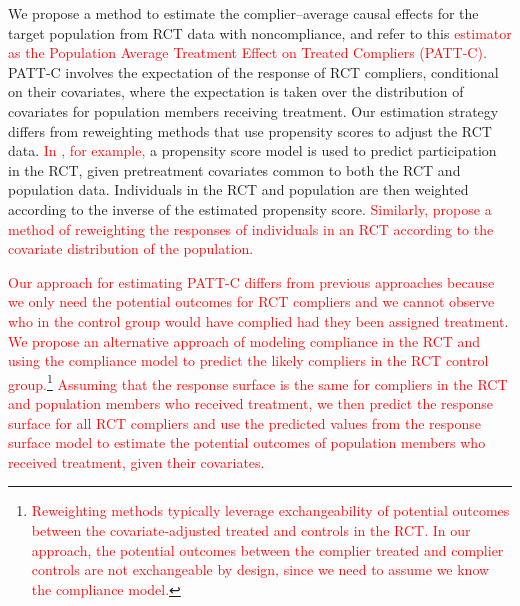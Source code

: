 \documentclass[hidelinks,12pt]{article}
\begin{document}
We propose a method to estimate the complier--average causal effects for the target population from RCT data with noncompliance, and refer to this \textcolor{red}{estimator as the Population Average Treatment Effect on Treated Compliers (PATT-C).} PATT-C involves the expectation of the response of RCT compliers, conditional on their covariates, where the expectation is taken over the distribution of covariates for population members receiving treatment. Our estimation strategy differs from reweighting methods that use propensity scores to adjust the RCT data. \textcolor{red}{In \citet{stuart2011use}, for example,} a propensity score model is used to predict participation in the RCT, given pretreatment covariates common to both the RCT and population data. Individuals in the RCT and population are then weighted according to the inverse of the estimated propensity score. \textcolor{red}{Similarly, \citet{Hartman} propose a method of reweighting the responses of individuals in an RCT according to the covariate distribution of the population.} 

\textcolor{red}{Our approach for estimating PATT-C differs from previous approaches because we only need the potential outcomes for RCT compliers and we cannot observe who in the control group would have complied had they been assigned treatment. We propose an alternative approach of modeling compliance in the RCT and using the compliance model to predict the likely compliers in the RCT control group.\footnote{\textcolor{red}{Reweighting methods typically leverage exchangeability of potential outcomes between the covariate-adjusted treated and controls in the RCT. In our approach, the potential outcomes between the complier treated and complier controls are not exchangeable by design, since we need to assume we know the compliance model.}} Assuming that the response surface is the same for compliers in the RCT and population members who received treatment, we then predict the response surface for all RCT compliers and use the predicted values from the response surface model to estimate the potential outcomes of population members who received treatment, given their covariates.}
\end{document}

